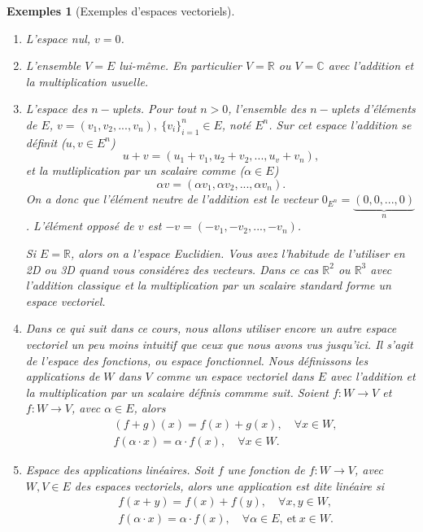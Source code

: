 \documentclass[a4paper,12pt]{book}
\newcommand{\real}{\mathbb{R}}
\newcommand{\complex}{\mathbb{C}}
\newtheorem*{exemples}{Exemples}
\begin{document}
\begin{exemples}[Exemples d'espaces vectoriels]\hfill\break

 \begin{enumerate}
  \item L'espace nul, $v=0$.
  \item L'ensemble $V=E$ lui-même. En particulier $V=\real$ ou $V=\complex$ avec l'addition et la multiplication usuelle.
  \item L'espace des $n-$uplets. Pour tout $n>0$, l'ensemble des $n-$uplets d'éléments de $E$, $v=(v_1,v_2,...,v_n),\ \{v_i\}_{i=1}^n\in E$,
  noté $E^n$. Sur cet espace l'addition se définit ($u,v\in E^n$)
  \begin{equation}
   u+v=(u_1+v_1,u_2+v_2,...,u_v+v_n),
  \end{equation}
  et la mutliplication par un scalaire comme ($\alpha\in E$)
  \begin{equation}
   \alpha v=(\alpha v_1,\alpha v_2,...,\alpha v_n).
  \end{equation}
  On a donc que l'élément neutre de l'addition est le vecteur $0_{E^n}=\underbrace{(0,0,...,0)}_{n}$. L'élément opposé de 
  $v$ est $-v=(-v_1,-v_2,...,-v_n)$. 
  
  Si $E=\real$, alors on a l'espace Euclidien. Vous avez l'habitude de l'utiliser en 2D ou 3D 
  quand vous considérez des vecteurs. Dans ce cas $\real^2$ ou $\real^3$ avec l'addition classique
  et la multiplication par un scalaire standard forme un espace vectoriel.
  \item Dans ce qui suit dans ce cours, nous allons utiliser encore un autre espace vectoriel
  un peu moins intuitif que ceux que nous avons vus jusqu'ici. Il s'agit de l'espace des fonctions, ou espace fonctionnel.
  Nous définissons les applications de $W$ dans $V$ comme un espace vectoriel dans $E$ avec l'addition et la
  multiplication par un scalaire définis commme suit. Soient $f:W\rightarrow V$ et $f:W\rightarrow V$, avec
  $\alpha\in E$, alors
  \begin{align}
   &(f+g)(x)=f(x)+g(x), \quad \forall x\in W,\\
   &f(\alpha\cdot x)=\alpha\cdot f(x), \quad \forall x\in W.
  \end{align}
  \item Espace des applications linéaires. Soit $f$ une fonction de $f:W\rightarrow V$, avec $W,V\in E$ des espaces vectoriels,
  alors une application est dite linéaire si 
  \begin{align}
   &f(x+y)=f(x)+f(y),\quad \forall x,y\in W,\\
   &f(\alpha \cdot x)=\alpha \cdot f(x),\quad \forall \alpha\in E,\ \mbox{et}\ x\in W.
  \end{align}

 \end{enumerate}
\end{exemples}
\end{document}
